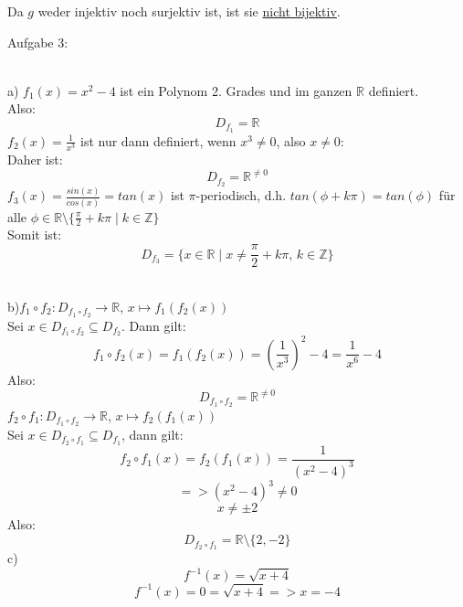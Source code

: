 \documentclass[11pt]{article}
\begin{document}
				Da $g$ weder injektiv noch surjektiv ist, ist sie \underline{nicht bijektiv}.\\
		\noindent \begin{Large}Aufgabe 3:\end{Large}\\[2pt]
			\indent a) 
				$f_1(x)=x^2-4$ ist ein Polynom 2. Grades und im ganzen $\mathbb{R}$ definiert.\\ Also:
				$$D_{f_1} = \mathbb{R}$$
				$f_2(x)=\frac{1}{x^3}$ ist nur dann definiert, wenn $x^3 \neq 0$, also $x \neq 0$:\\Daher ist:
				$$D_{f_2} = \mathbb{R}^{\neq 0}$$
				$f_3(x) = \frac{sin(x)}{cos(x)} = tan(x)$ ist $\pi$-periodisch, d.h. $tan(\phi + k\pi)=tan(\phi)$ für alle $\phi \in \mathbb{R} \setminus \{\frac{\pi}{2}+k\pi \mid k \in \mathbb{Z}\}$\\
				Somit ist:
				$$D_{f_3} = \{x \in \mathbb{R} \mid x \neq \frac{\pi}{2}+k \pi \mbox{, } k \in \mathbb{Z}\}$$
				\\
			\indent b)$f_1 \circ f_2 : D_{f_1 \circ f_2} \rightarrow \mathbb{R}$, $x \mapsto f_1(f_2(x))$\\
				Sei $x \in D_{f_1 \circ f_2} \subseteq D_{f_2}$. Dann gilt:
				$$f_1 \circ f_2(x) = f_1(f_2(x)) = \left(\frac{1}{x^3}\right)^2-4=\frac{1}{x^6}-4$$
				Also:
				$$D_{f_1\circ f_2} = \mathbb{R}^{\neq 0}$$
				$f_2 \circ f_1: D_{f_1 \circ f_2} \rightarrow \mathbb{R}$, $x \mapsto f_2(f_1(x))$\\
				Sei $x \in D_{f_2 \circ f_1} \subseteq D_{f_1}$, dann gilt:
				$$f_2 \circ f_1(x) = f_2(f_1(x)) = \frac{1}{(x^2-4)^3}$$
				$$=> (x^2-4)^3 \neq 0$$
				$$x \neq \pm 2$$
				Also:
				$$D_{f_2 \circ f_1} = \mathbb{R}\setminus \{2,-2\}$$
			\indent c)
				$$f^{-1}(x)=\sqrt{x+4}$$
				$$f^{-1}(x)=0=\sqrt{x+4} => x=-4$$
\end{document}
